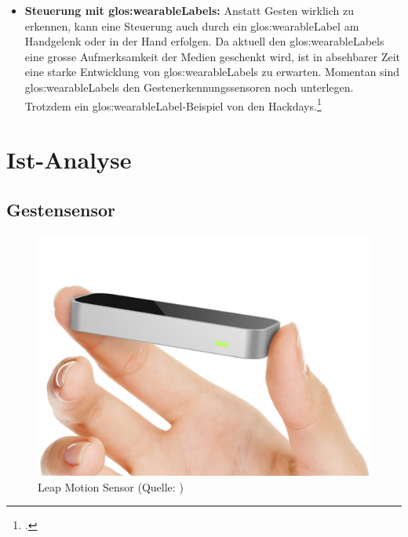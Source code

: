 \begin{itemize}
	\item \textbf{Steuerung mit \glspl{glos:wearableLabel}:}
	Anstatt Gesten wirklich zu erkennen, kann eine Steuerung auch durch ein \gls{glos:wearableLabel} am Handgelenk oder in der Hand erfolgen.
	Da aktuell den \glspl{glos:wearableLabel} eine grosse Aufmerksamkeit der Medien geschenkt wird, ist in absehbarer Zeit eine starke Entwicklung von \glspl{glos:wearableLabel} zu erwarten.
	Momentan sind \glspl{glos:wearableLabel} den Gestenerkennungssensoren noch unterlegen.
	Trotzdem ein \gls{glos:wearableLabel}-Beispiel von den Hackdays.\footcite{Wearable_Gesture_Controlled_Drone_Hackaday_2015-04-29}
\end{itemize}



\clearpage
\section{Ist-Analyse}

\subsection{Gestensensor} \label{subsec:leapmotion}
\begin{figure}
	\includegraphics[width=1.0\linewidth]{images/analysis/leap_simple.png}
	\caption[Leap Motion Sensor]{Leap Motion Sensor (Quelle: )}
\end{figure}

